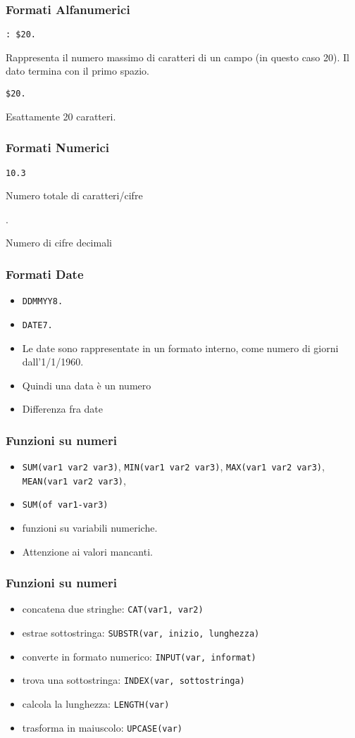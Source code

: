 \documentclass[12pt]{beamer}
\begin{document}
\begin{frame}[fragile]\frametitle{Formati Alfanumerici}
  \verb!: $20.!

  Rappresenta il numero massimo di caratteri di un campo (in questo caso
  20). Il dato termina con il primo spazio.

  \verb!$20.!

  Esattamente 20 caratteri.
\end{frame}

\begin{frame}[fragile]\frametitle{Formati Numerici}
  \verb!10.3!

  Numero totale di caratteri/cifre

  .

  Numero di cifre decimali
\end{frame}



\begin{frame}[fragile]\frametitle{Formati Date}
  \begin{itemize}
  \item
    \verb!DDMMYY8.!
  \item
    \verb!DATE7.!
  \item
    Le date sono rappresentate in un formato interno, come numero di giorni dall'1/1/1960.
  \item
    Quindi una data {\`e} un numero
  \item
    Differenza fra date
  \end{itemize}
\end{frame}

\begin{frame}[fragile]\frametitle{Funzioni su numeri}
  \begin{itemize}
  \item
    \verb!SUM(var1 var2 var3)!,  \verb!MIN(var1 var2 var3)!,
    \verb!MAX(var1 var2 var3)!,     \verb!MEAN(var1 var2 var3)!,
  \item
    \verb!SUM(of var1-var3)!
  \item
    funzioni su variabili numeriche.
  \item
    Attenzione ai valori mancanti.
  \end{itemize}
\end{frame}

\begin{frame}[fragile]\frametitle{Funzioni su numeri}
  \begin{itemize}
  \item
    concatena due stringhe:     \verb!CAT(var1, var2)! 
  \item
    estrae sottostringa:
    \verb!SUBSTR(var, inizio, lunghezza)!
  \item
    converte in formato numerico:
    \verb!INPUT(var, informat)!
  \item
  trova una sottostringa:
    \verb!INDEX(var, sottostringa)!
  \item
  calcola la lunghezza:
    \verb!LENGTH(var)!
  \item
  trasforma in maiuscolo:
    \verb!UPCASE(var)!
  \end{itemize}
\end{frame}
\end{document}
